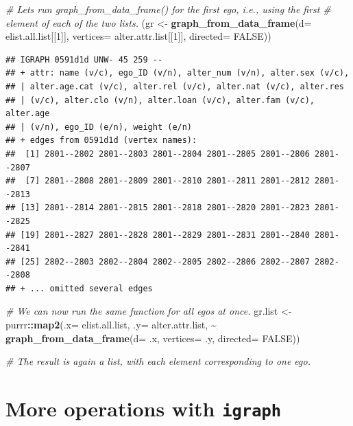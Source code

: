 \documentclass[
]{book}
\newenvironment{Shaded}{\begin{snugshade}}{\end{snugshade}}
\newcommand{\AttributeTok}[1]{\textcolor[rgb]{0.13,0.29,0.53}{#1}}
\newcommand{\CommentTok}[1]{\textcolor[rgb]{0.56,0.35,0.01}{\textit{#1}}}
\newcommand{\ConstantTok}[1]{\textcolor[rgb]{0.56,0.35,0.01}{#1}}
\newcommand{\DecValTok}[1]{\textcolor[rgb]{0.00,0.00,0.81}{#1}}
\newcommand{\FunctionTok}[1]{\textcolor[rgb]{0.13,0.29,0.53}{\textbf{#1}}}
\newcommand{\NormalTok}[1]{#1}
\newcommand{\OtherTok}[1]{\textcolor[rgb]{0.56,0.35,0.01}{#1}}
\newcommand{\SpecialCharTok}[1]{\textcolor[rgb]{0.81,0.36,0.00}{\textbf{#1}}}
\begin{document}
\begin{Shaded}
\begin{Highlighting}[]
\CommentTok{\# Let\textquotesingle{}s run graph\_from\_data\_frame() for the first ego, i.e., using the first}
\CommentTok{\# element of each of the two lists.}
\NormalTok{(gr }\OtherTok{\textless{}{-}} \FunctionTok{graph\_from\_data\_frame}\NormalTok{(}\AttributeTok{d=}\NormalTok{ elist.all.list[[}\DecValTok{1}\NormalTok{]], }
                             \AttributeTok{vertices=}\NormalTok{ alter.attr.list[[}\DecValTok{1}\NormalTok{]], }\AttributeTok{directed=} \ConstantTok{FALSE}\NormalTok{))}
\end{Highlighting}
\end{Shaded}

\begin{verbatim}
## IGRAPH 0591d1d UNW- 45 259 -- 
## + attr: name (v/c), ego_ID (v/n), alter_num (v/n), alter.sex (v/c),
## | alter.age.cat (v/c), alter.rel (v/c), alter.nat (v/c), alter.res
## | (v/c), alter.clo (v/n), alter.loan (v/c), alter.fam (v/c), alter.age
## | (v/n), ego_ID (e/n), weight (e/n)
## + edges from 0591d1d (vertex names):
##  [1] 2801--2802 2801--2803 2801--2804 2801--2805 2801--2806 2801--2807
##  [7] 2801--2808 2801--2809 2801--2810 2801--2811 2801--2812 2801--2813
## [13] 2801--2814 2801--2815 2801--2818 2801--2820 2801--2823 2801--2825
## [19] 2801--2827 2801--2828 2801--2829 2801--2831 2801--2840 2801--2841
## [25] 2802--2803 2802--2804 2802--2805 2802--2806 2802--2807 2802--2808
## + ... omitted several edges
\end{verbatim}

\begin{Shaded}
\begin{Highlighting}[]
\CommentTok{\# We can now run the same function for all egos at once.}
\NormalTok{gr.list }\OtherTok{\textless{}{-}}\NormalTok{ purrr}\SpecialCharTok{::}\FunctionTok{map2}\NormalTok{(}\AttributeTok{.x=}\NormalTok{ elist.all.list, }\AttributeTok{.y=}\NormalTok{ alter.attr.list, }
                       \SpecialCharTok{\textasciitilde{}} \FunctionTok{graph\_from\_data\_frame}\NormalTok{(}\AttributeTok{d=}\NormalTok{ .x, }\AttributeTok{vertices=}\NormalTok{ .y, }\AttributeTok{directed=} \ConstantTok{FALSE}\NormalTok{))}

\CommentTok{\# The result is again a list, with each element corresponding to one ego.}
\end{Highlighting}
\end{Shaded}

\hypertarget{more-igraph}{%
\section{\texorpdfstring{More operations with \texttt{igraph}}{More operations with igraph}}\label{more-igraph}}
\end{document}
